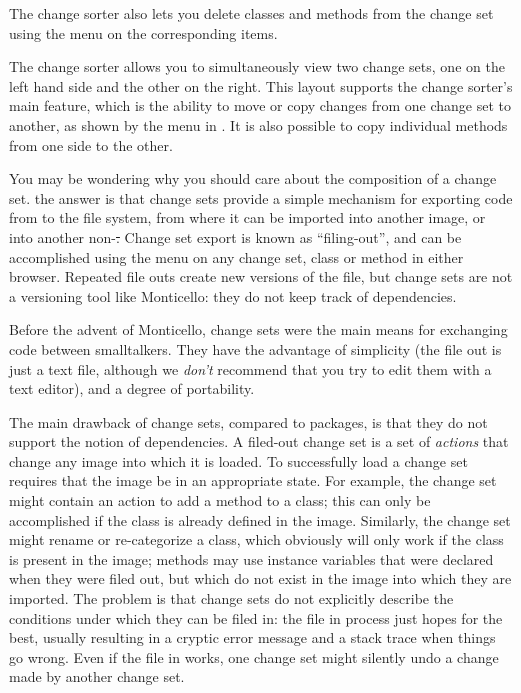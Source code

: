 \documentclass[a4paper,10pt,twoside]{book}
\begin{document}
The change sorter also lets you delete classes and methods from the change set using the \actclick menu on the corresponding items.

The change sorter allows you to simultaneously view two change sets, one on the left hand side and the other on the right.
This layout supports the change sorter's main feature, which is the ability to move or copy changes from one change set to another, as shown by the \actclick menu in .
It is also possible to copy individual methods from one side to the other.

You may be wondering why you should care about the composition of a change set.
the answer is that change sets provide a simple mechanism for exporting code from \pharo to the file system, from where it can be imported into another \pharo image, or into another non-\pharo \st.
Change set export is known as ``filing-out'', and can be accomplished using the \actclick menu on any change set, class or method in either browser.
Repeated file outs create new versions of the file, but change sets are not a versioning tool like Monticello:
they do not keep track of dependencies.

Before the advent of Monticello, change sets were the main means for exchanging code between smalltalkers.
They have the advantage of simplicity (the file out is just a text file, although we \emph{don't} recommend that you try to edit them with a text editor), and a degree of portability.  

The main drawback of change sets, compared to  packages, is that they do not support the notion of dependencies.
A filed-out change set is a set of \emph{actions} that change any image into which it is loaded. To successfully load a change set requires that the image be in an appropriate state.
For example, the change set might contain an action to add a method to a class; this can only be accomplished if the class is already defined in the image.
Similarly, the change set might rename or re-categorize a class, which obviously will only work if the class is present in the image; methods may use instance variables that were declared when they were filed out, but which do not exist in the image into which they are imported.
The problem is that change sets do not explicitly describe the conditions under which they can be filed in:
the file in process just hopes for the best, usually resulting in a cryptic error message and a stack trace when things go wrong.
Even if the file in works, one change set might silently undo a change made by another change set.
\end{document}
